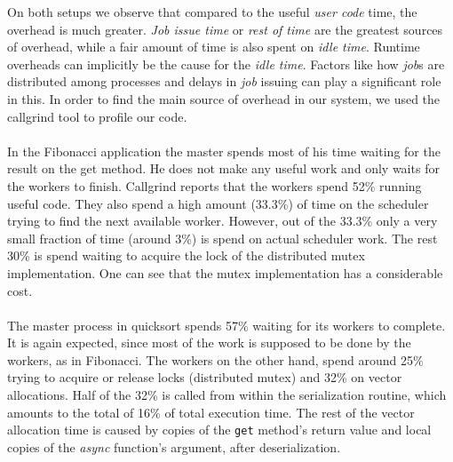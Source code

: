 On both setups we observe that compared to the useful \emph{user code} time, the overhead is much greater.
\emph{Job issue time} or \emph{rest of time} are the greatest sources of 
overhead, while a fair amount of time is also spent on \emph{idle time}.  Runtime overheads can 
implicitly be the cause for the \emph{idle time}.  Factors like how \emph{job}s
are distributed among processes and delays in \emph{job} issuing can play a significant role in this.
In order to find the main source of overhead in our system, we used the callgrind tool
to profile our code.  

\paragraph{}
In the Fibonacci application the master spends most of his time waiting for the result on the 
get method.  He does not make any useful work and only waits for the workers to finish.  Callgrind reports that the
workers spend 52\% running useful code.  They also spend a high amount (33.3\%) of time on the scheduler trying to 
find the next available worker.  However, out of the 33.3\% only a very small fraction of time (around 3\%) is spend
on actual scheduler work.  The rest 30\% is spend waiting to acquire the lock of the distributed mutex implementation.
One can see that the mutex implementation has a considerable cost.   

\paragraph{}
The master process in quicksort spends 57\% waiting for its workers to complete.  It is again expected, since
most of the work is supposed to be done by the workers, as in Fibonacci.   The workers on the other hand, spend
around 25\% trying to acquire or release locks (distributed mutex) and 32\% on vector allocations.  Half of the
32\% is called from within the serialization routine, which amounts to the total of 16\% of total execution time.
The rest of the vector allocation time is caused by copies of the \texttt{get} method's return value and local
copies of the \emph{async} function's argument, after deserialization.

